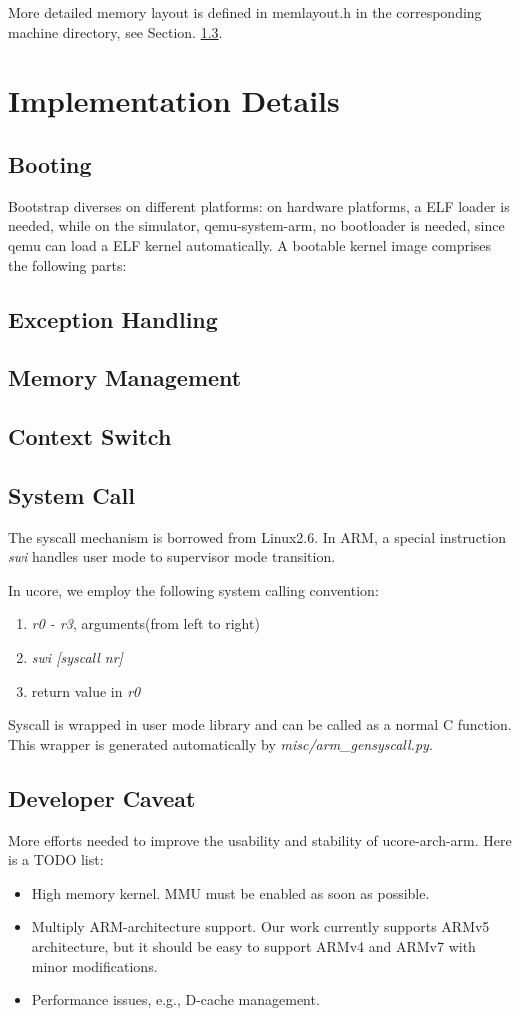 \documentclass[a4paper]{article}
\begin{document}
More detailed memory layout is defined in memlayout.h in the corresponding
machine directory, see Section. \ref{sec:mm}.

\section{Implementation Details}
\subsection{Booting}
Bootstrap diverses on different platforms: on hardware platforms, a ELF
loader is needed, while on the simulator, qemu-system-arm, no bootloader
is needed, since qemu can load a ELF kernel automatically.
A bootable kernel image  comprises  the following parts:



\subsection{Exception Handling}
\subsection{Memory Management}
\label{sec:mm}
\subsection{Context Switch}
\subsection{System Call}
The syscall mechanism is borrowed from Linux2.6. In ARM, a special 
instruction \emph{swi} handles user mode to supervisor mode transition.

In ucore, we employ the following system calling convention:
\begin{enumerate}
  \item \emph{r0 - r3}, arguments(from left to right)
  \item \emph{swi [syscall nr]}
  \item return value in \emph{r0}
\end{enumerate}

Syscall is wrapped in user mode library and can be called as a normal 
C function. This wrapper is generated automatically by 
\emph{misc/arm\_gensyscall.py}.

\subsection{Developer Caveat}
More efforts needed to improve the usability and stability of ucore-arch-arm. Here is a TODO list:
\begin{itemize}
  \item High memory kernel. MMU must be enabled as soon as possible.
  \item Multiply ARM-architecture support. Our work currently supports
    ARMv5 architecture, but it should be easy to support ARMv4 and ARMv7
    with minor modifications.
  \item Performance issues, e.g., D-cache management.
\end{itemize}
\end{document}
